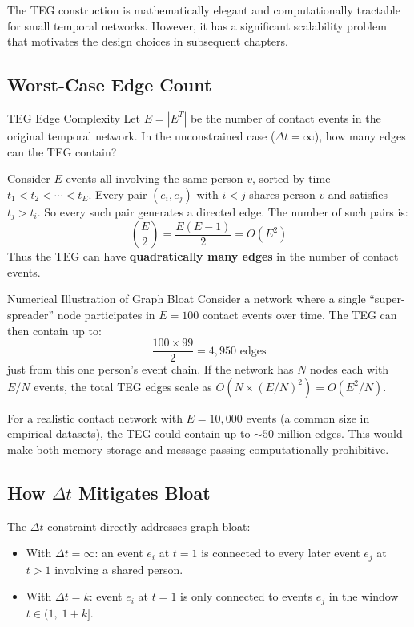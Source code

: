 The TEG construction is mathematically elegant and computationally tractable
for small temporal networks. However, it has a significant scalability problem
that motivates the design choices in subsequent chapters.

\subsection{Worst-Case Edge Count}

\begin{mathbox}{TEG Edge Complexity}
Let $E = |E^T|$ be the number of contact events in the original temporal
network. In the unconstrained case ($\Delta t = \infty$), how many edges can
the TEG contain?

Consider $E$ events all involving the same person $v$, sorted by time
$t_1 < t_2 < \cdots < t_E$. Every pair $(e_i, e_j)$ with $i < j$ shares
person $v$ and satisfies $t_j > t_i$. So every such pair generates a directed
edge. The number of such pairs is:
\[
    \binom{E}{2} = \frac{E(E-1)}{2} = O(E^2)
\]
Thus the TEG can have \textbf{quadratically many edges} in the number of
contact events.
\end{mathbox}

\begin{examplebox}{Numerical Illustration of Graph Bloat}
Consider a network where a single ``super-spreader'' node participates in
$E = 100$ contact events over time. The TEG can then contain up to:
\[
    \frac{100 \times 99}{2} = 4{,}950 \text{ edges}
\]
just from this one person's event chain. If the network has $N$ nodes each with
$E/N$ events, the total TEG edges scale as $O(N \times (E/N)^2) = O(E^2/N)$.

For a realistic contact network with $E = 10{,}000$ events (a common size in
empirical datasets), the TEG could contain up to $\sim 50$ million edges. This
would make both memory storage and message-passing computationally prohibitive.
\end{examplebox}

\subsection{How $\Delta t$ Mitigates Bloat}

The $\Delta t$ constraint directly addresses graph bloat:

\begin{itemize}
    \item With $\Delta t = \infty$: an event $e_i$ at $t=1$ is connected to
          every later event $e_j$ at $t > 1$ involving a shared person.
    \item With $\Delta t = k$: event $e_i$ at $t=1$ is only connected to events
          $e_j$ in the window $t \in (1,\; 1+k]$.
\end{itemize}

